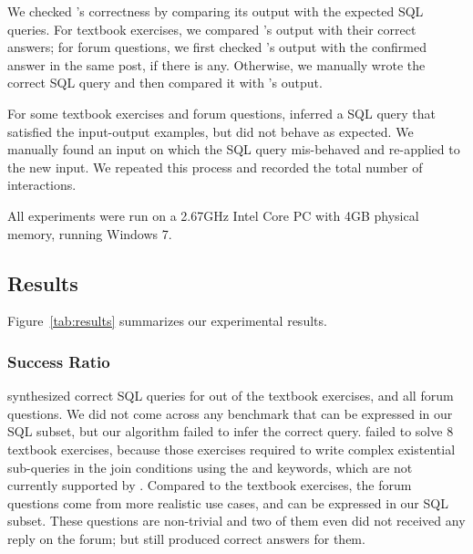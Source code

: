 We checked \ourtool's correctness by comparing its
output with the expected SQL queries.
For textbook exercises, we compared \ourtool's output with
their correct answers; for forum questions, we first
checked \ourtool's output with the confirmed answer
in the same post, if there is any. Otherwise, we
manually wrote the correct SQL query and then
compared it with \ourtool's output.

For some textbook exercises and forum questions,
\ourtool inferred a SQL query that satisfied the input-output
examples, but did not behave as expected.
We manually found an input on which the
SQL query mis-behaved and re-applied \ourtool to the new input. We
repeated this process and recorded the total number of
interactions.


All experiments were run on a 2.67GHz Intel Core PC
with 4GB physical memory, running Windows 7.





\vspace{-2mm}
\subsection{Results}
\vspace{-1mm}

Figure~\ref{tab:results} summarizes our experimental results.

\subsubsection{Success Ratio}
\label{sec:ratio}


\ourtool synthesized correct SQL queries for \solexnum  out of
\exnum the textbook exercises, and 
all \pnum forum questions.
We did not come across any benchmark
that can be expressed in our SQL subset,
but our algorithm failed to infer the correct query.
\ourtool failed to solve 8 textbook exercises,
because those exercises required to write
complex existential sub-queries in the join conditions
using the  and  keywords,
which are not currently supported by \ourtool.
Compared to the textbook exercises, the \pnum
forum questions come from more realistic use cases,
and can be expressed in our SQL subset.
These questions are non-trivial and
two of them even did not received any reply on the forum;
but \ourtool still produced correct answers for them.



